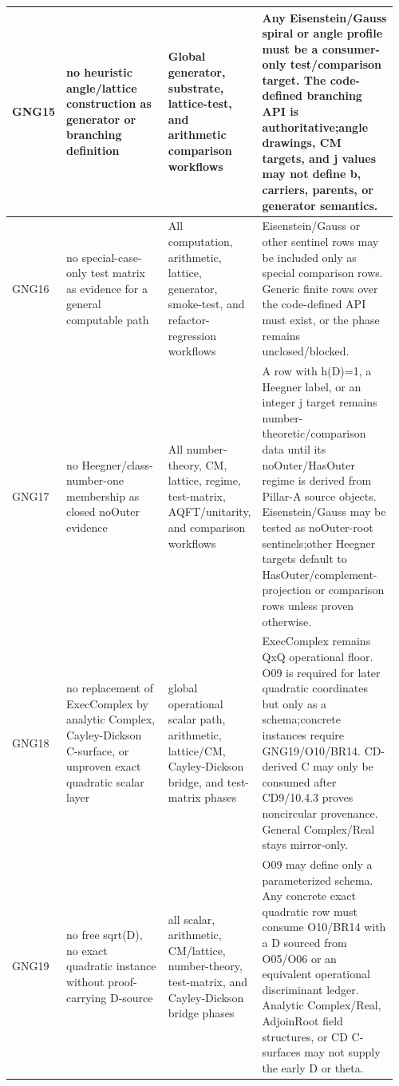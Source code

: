 \begin{longtable}{L{0.045\linewidth} L{0.345\linewidth} L{0.185\linewidth} L{0.39\linewidth}}
\hline
\addlinespace[0.24em]
GNG15 & no heuristic angle/\allowbreak{}lattice construction as generator or branching definition & Global generator, substrate, lattice-test, and arithmetic comparison workflows & Any Eisenstein/\allowbreak{}Gauss spiral or angle profile must be a consumer-only test/\allowbreak{}comparison target. The code-defined branching API is authoritative;\newline angle drawings, CM targets, and j values may not define b, carriers, parents, or generator semantics.\\
\hline
\addlinespace[0.24em]
GNG16 & no special-case-only test matrix as evidence for a general computable path & All computation, arithmetic, lattice, generator, smoke-test, and refactor-regression workflows & Eisenstein/\allowbreak{}Gauss or other sentinel rows may be included only as special comparison rows. Generic finite rows over the code-defined API must exist, or the phase remains unclosed/\allowbreak{}blocked.\\
\hline
\addlinespace[0.24em]
GNG17 & no Heegner/\allowbreak{}class-number-one membership as closed noOuter evidence & All number-theory, CM, lattice, regime, test-matrix, AQFT/\allowbreak{}unitarity, and comparison workflows & A row with h(D)=1, a Heegner label, or an integer j target remains number-theoretic/\allowbreak{}comparison data until its noOuter/\allowbreak{}HasOuter regime is derived from Pillar-A source objects. Eisenstein/\allowbreak{}Gauss may be tested as noOuter-root sentinels;\newline other Heegner targets default to HasOuter/\allowbreak{}complement-projection or comparison rows unless proven otherwise.\\
\hline
\addlinespace[0.24em]
GNG18 & no replacement of ExecComplex by analytic Complex, Cayley-Dickson C-surface, or unproven exact quadratic scalar layer & global operational scalar path, arithmetic, lattice/\allowbreak{}CM, Cayley-Dickson bridge, and test-matrix phases & ExecComplex remains QxQ operational floor. O09 is required for later quadratic coordinates but only as a schema;\newline concrete instances require GNG19/\allowbreak{}O10/\allowbreak{}BR14. CD-derived C may only be consumed after CD9/\allowbreak{}10.4.3 proves noncircular provenance. General Complex/\allowbreak{}Real stays mirror-only.\\
\hline
\addlinespace[0.24em]
GNG19 & no free sqrt(D), no exact quadratic instance without proof-carrying D-source & all scalar, arithmetic, CM/\allowbreak{}lattice, number-theory, test-matrix, and Cayley-Dickson bridge phases & O09 may define only a parameterized schema. Any concrete exact quadratic row must consume O10/\allowbreak{}BR14 with a D sourced from O05/\allowbreak{}O06 or an equivalent operational discriminant ledger. Analytic Complex/\allowbreak{}Real, AdjoinRoot field structures, or CD C-surfaces may not supply the early D or theta.\\

\end{longtable}
